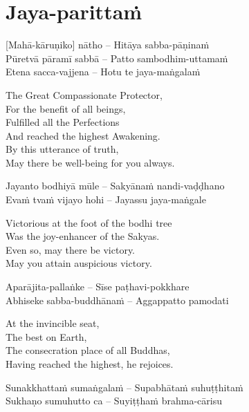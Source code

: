 \section{Jaya-parittaṁ}
\label{jaya-parittam}

\vspace{-0.6em}

[Mahā-kāruṇiko] nātho – Hitāya sabba-pāṇinaṁ\\
Pūretvā pāramī sabbā – Patto sambodhim-uttamaṁ\\
Etena sacca-vajjena – Hotu te jaya-maṅgalaṁ

\begin{english-verses}
  The Great Compassionate Protector,\\
  For the benefit of all beings,\\
  Fulfilled all the Perfections\\
  And reached the highest Awakening.\\
  By this utterance of truth,\\
  May there be well-being for you always.
\end{english-verses}

Jayanto bodhiyā mūle – Sakyānaṁ nandi-vaḍḍhano\\
Evaṁ tvaṁ vijayo hohi – Jayassu jaya-maṅgale

\begin{english-verses}
  Victorious at the foot of the bodhi tree\\
  Was the joy-enhancer of the Sakyas.\\
  Even so, may there be victory.\\
  May you attain auspicious victory.
\end{english-verses}

Aparājita-pallaṅke – Sīse paṭhavi-pokkhare\\
Abhiseke sabba-buddhānaṁ – Aggappatto pamodati

\begin{english-verses}
  At the invincible seat,\\
  The best on Earth,\\
  The consecration place of all Buddhas,\\
  Having reached the highest, he rejoices.
\end{english-verses}

\suttaRef{[MJG]}

Sunakkhattaṁ sumaṅgalaṁ – Supabhātaṁ suhuṭṭhitaṁ\\
Sukhaṇo sumuhutto ca – Suyiṭṭhaṁ brahma-cārisu

